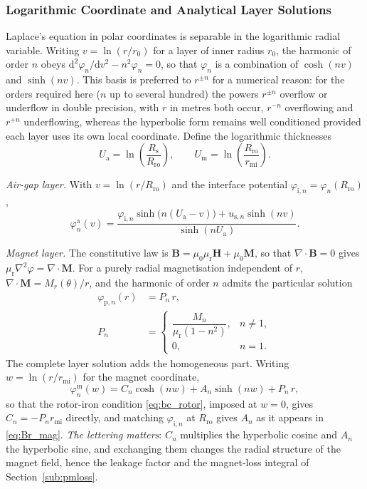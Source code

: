 \documentclass[10pt,a4paper,twocolumn]{article}
\newcommand{\Rs}{R_{\mathrm{s}}}
\newcommand{\Rro}{R_{\mathrm{ro}}}
\newcommand{\rmi}{r_{\mathrm{mi}}}
\newcommand{\murec}{\mu_{\mathrm{r}}}
\newcommand{\Ua}{U_{\mathrm{a}}}
\newcommand{\Um}{U_{\mathrm{m}}}
\theoremstyle{plain}
\theoremstyle{remark}
\begin{document}
\subsubsection{Logarithmic Coordinate and Analytical Layer Solutions}

Laplace's equation in polar coordinates is separable in the logarithmic
radial variable. Writing $v=\ln(r/r_0)$ for a layer of inner radius
$r_0$, the harmonic of order $n$ obeys
$\mathrm{d}^2\varphi_n/\mathrm{d}v^2 - n^2\varphi_n = 0$, so that
$\varphi_n$ is a combination of $\cosh(nv)$ and $\sinh(nv)$. This basis
is preferred to $r^{\pm n}$ for a numerical reason: for the orders
required here ($n$ up to several hundred) the powers $r^{\pm n}$
overflow or underflow in double precision, with $r$ in metres both
occur, $r^{-n}$ overflowing and $r^{+n}$ underflowing, whereas the
hyperbolic form remains well
conditioned provided each layer uses its own local coordinate. Define
the logarithmic thicknesses
\begin{equation}
\Ua = \ln\!\left(\frac{\Rs}{\Rro}\right),
\qquad
\Um = \ln\!\left(\frac{\Rro}{\rmi}\right).
\label{eq:thick}
\end{equation}

\emph{Air-gap layer.} With $v=\ln(r/\Rro)$ and the interface potential
$\varphi_{\mathrm{i},n} = \varphi_n(\Rro)$,
\begin{equation}
\varphi_n^{\mathrm{a}}(v) =
\frac{\varphi_{\mathrm{i},n}\sinh\!\big(n(\Ua-v)\big)
      + u_{\mathrm{s},n}\sinh(nv)}{\sinh(n\Ua)} .
\label{eq:phi_air}
\end{equation}

\emph{Magnet layer.} The constitutive law is
$\bm{B} = \mu_0\murec\bm{H} + \mu_0\bm{M}$, so that
$\nabla\!\cdot\!\bm{B}=0$ gives
$\murec\nabla^2\varphi = \nabla\!\cdot\!\bm{M}$. For a purely radial
magnetisation independent of $r$, $\nabla\!\cdot\!\bm{M}=M_r(\theta)/r$,
and the harmonic of order $n$ admits the particular solution
\begin{equation}
\begin{aligned}
\varphi_{\mathrm{p},n}(r) &= P_n\,r ,\\[1ex]
P_n &=
\begin{cases}
\dfrac{M_n}{\murec\left(1-n^{2}\right)}, & n \neq 1,\\[2ex]
0, & n = 1 .
\end{cases}
\end{aligned}
\label{eq:particular}
\end{equation}
The complete layer solution adds the homogeneous part. Writing
$w=\ln(r/\rmi)$ for the magnet coordinate,
\begin{equation}
\varphi^{\mathrm{m}}_n(w)=C_n\cosh(nw)+A_n\sinh(nw)+P_n\,r ,
\label{eq:magnet_layer}
\end{equation}
so that the rotor-iron condition \eqref{eq:bc_rotor}, imposed at $w=0$,
gives $C_n=-P_n\rmi$ directly, and matching $\varphi_{\mathrm{i},n}$ at
$\Rro$ gives $A_n$ as it appears in \eqref{eq:Br_mag}. \emph{The
lettering matters}: $C_n$ multiplies the hyperbolic cosine and $A_n$ the
hyperbolic sine, and exchanging them changes the radial structure of the
magnet field, hence the leakage factor and the magnet-loss integral of
Section~\ref{sub:pmloss}.
\end{document}

